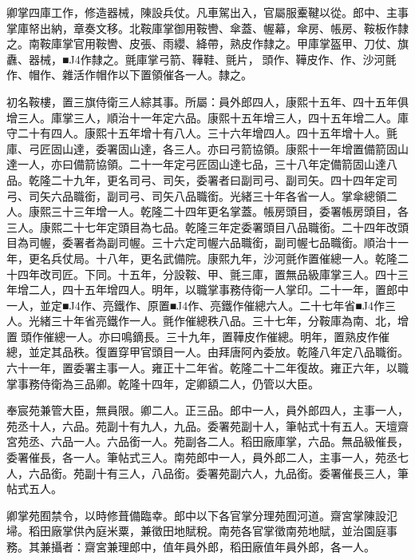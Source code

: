 \begin{pinyinscope}
卿掌四庫工作，修造器械，陳設兵仗。凡車駕出入，官屬服櫜鞬以從。郎中、主事掌庫帑出納，章奏文移。北鞍庫掌御用鞍轡、傘蓋、幄幕，傘房、帳房、鞍板作隸之。南鞍庫掌官用鞍轡、皮張、雨纓、絳帶，熟皮作隸之。甲庫掌盔甲、刀仗、旗纛、器械，■J4作隸之。氈庫掌弓箭、鞾鞋、氈片，頭作、鞾皮作、作、沙河氈作、帽作、雜活作帽作以下置領催各一人。隸之。

初名鞍樓，置三旗侍衛三人綜其事。所屬：員外郎四人，康熙十五年、四十五年俱增三人。庫掌三人，順治十一年定六品。康熙十五年增三人，四十五年增二人。庫守二十有四人。康熙十五年增十有八人。三十六年增四人。四十五年增十人。氈庫、弓匠固山達，委署固山達，各三人。亦曰弓箭協領。康熙十一年增置備箭固山達一人，亦曰備箭協領。二十一年定弓匠固山達七品，三十八年定備箭固山達八品。乾隆二十九年，更名司弓、司矢，委署者曰副司弓、副司矢。四十四年定司弓、司矢六品職銜，副司弓、司矢八品職銜。光緒三十年各省一人。掌傘總領二人。康熙三十三年增一人。乾隆二十四年更名掌蓋。帳房頭目，委署帳房頭目，各三人。康熙二十七年定頭目為七品。乾隆三年定委署頭目八品職銜。二十四年改頭目為司幄，委署者為副司幄。三十六定司幄六品職銜，副司幄七品職銜。順治十一年，更名兵仗局。十八年，更名武備院。康熙九年，沙河氈作置催總一人。乾隆二十四年改司匠。下同。十五年，分設鞍、甲、氈三庫，置無品級庫掌三人。四十三年增二人，四十五年增四人。明年，以職掌事務侍衛一人掌印。二十一年，置郎中一人，並定■J4作、亮鐵作、原置■J4作、亮鐵作催總六人。二十七年省■J4作三人。光緒三十年省亮鐵作一人。氈作催總秩八品。三十七年，分鞍庫為南、北，增置頭作催總一人。亦曰鳴鏑長。三十九年，置鞾皮作催總。明年，置熟皮作催總，並定其品秩。復置穿甲官頭目一人。由拜唐阿內委放。乾隆八年定八品職銜。六十一年，置委署主事一人。雍正十二年省。乾隆二十二年復故。雍正六年，以職掌事務侍衛為三品卿。乾隆十四年，定卿額二人，仍管以大臣。

奉宸苑兼管大臣，無員限。卿二人。正三品。郎中一人，員外郎四人，主事一人，苑丞十人，六品。苑副十有九人，九品。委署苑副十人，筆帖式十有五人。天壇齋宮苑丞、六品一人。六品銜一人。苑副各二人。稻田廠庫掌，六品。無品級催長，委署催長，各一人。筆帖式三人。南苑郎中一人，員外郎二人，主事一人，苑丞七人，六品銜。苑副十有三人，八品銜。委署苑副六人，九品銜。委署催長三人，筆帖式五人。

卿掌苑囿禁令，以時修葺備臨幸。郎中以下各官掌分理苑囿河道。齋宮掌陳設氾埽。稻田廠掌供內庭米粟，兼徵田地賦稅。南苑各官掌徵南苑地賦，並治園庭事務。其兼攝者：齋宮兼理郎中，值年員外郎，稻田廠值年員外郎，各一人。


\end{pinyinscope}
